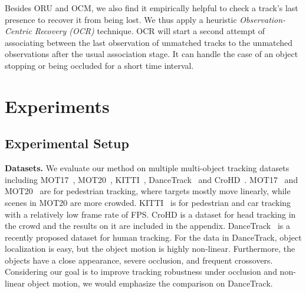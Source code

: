 \documentclass[10pt,twocolumn,letterpaper]{article}
\begin{document}
Besides ORU and OCM, we also find it empirically helpful to check a track's last presence to recover it from being lost. We thus apply a heuristic \textit{Observation-Centric Recovery (OCR)} technique.
OCR will start a second attempt of associating between the last observation of unmatched tracks to the unmatched observations after the usual association stage. It can handle the case of an object stopping or being occluded for a short time interval. 

\section{Experiments}
\subsection{Experimental Setup}
\noindent\textbf{Datasets.} We evaluate our method on multiple multi-object tracking datasets including MOT17~\cite{milan2016mot16}, MOT20~\cite{dendorfer2020mot20}, KITTI~\cite{kitti}, DanceTrack~\cite{sun2021dancetrack} and CroHD~\cite{headtrack}.
MOT17~\cite{milan2016mot16} and MOT20~\cite{dendorfer2020mot20} are for pedestrian tracking, where targets mostly move linearly,
while scenes in MOT20 are more crowded.
KITTI~\cite{kitti} is for pedestrian and car tracking with a relatively low frame rate of FPS.  CroHD is a dataset for head tracking in the crowd and the results on it are included in the appendix.
DanceTrack~\cite{sun2021dancetrack} is a recently proposed dataset for human tracking. For the data in DanceTrack, object localization is easy, but the object motion is highly non-linear. Furthermore, the objects have a close appearance, severe occlusion, and frequent crossovers.
Considering our goal is to improve tracking robustness under occlusion and non-linear object motion, we would emphasize the comparison on DanceTrack. 
\end{document}
